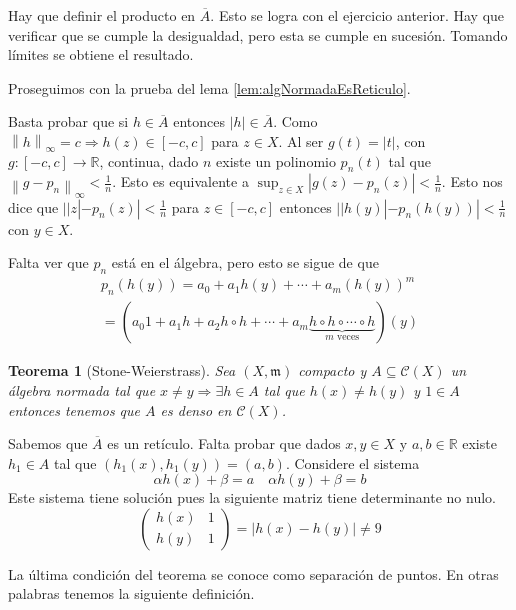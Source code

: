 \documentclass[12pt]{article}
\theoremstyle{plain}
\newtheorem{Th}{Teorema}[subsection]   %
\theoremstyle{definition}
\theoremstyle{remark}
\numberwithin{equation}{section}
\newcommand{\bR}{\mathbb{R}}        %
\newcommand{\cC}{\mathcal{C}}       %
\newcommand{\mm}{\mathfrak{m}}      %
\renewcommand{\:}{\colon}           %
\newcommand{\bonj}[1]{\left\lbrack#1\right\rbrack}
\newcommand{\nm}[1]{\left\|#1\right\|} %
\begin{document}
\begin{multicols}{2}
 \begin{ptcb}
 Hay que definir el producto en $\overline{A}$. Esto se logra con el ejercicio anterior. Hay que verificar que se cumple la desigualdad, pero esta se cumple en sucesión. Tomando límites se obtiene el resultado.
 \end{ptcb}

 Proseguimos con la prueba del lema \ref{lem:algNormadaEsReticulo}.
 \begin{ptcbp}
 Basta probar que si $h\in\overline{A}$ entonces $|h|\in\overline{A}$. Como $\nm{h}_\infty=c\Rightarrow h(z)\in\bonj{-c,c}$ para $z\in X$. Al ser $g(t)=|t|$, con $g\colon\bonj{-c,c}\to\bR$, continua, dado $n$ existe un polinomio $p_n(t)$ tal que $\nm{g-p_n}_\infty<\frac{1}{n}$. Esto es equivalente a $\sup_{z\in X}|g(z)-p_n(z)|<\frac{1}{n}$. Esto nos dice que $| |z|-p_n(z)|<\frac{1}{n}$ para $z\in\bonj{-c,c}$ entonces $| |h(y)|-p_n(h(y))|<\frac{1}{n}$ con $y\in X$.\par
 Falta ver que $p_n$ está en el álgebra, pero esto se sigue de que
\begin{gather*}
  p_n(h(y))=a_0+a_1h(y)+\cdots+a_m(h(y))^m \\
  =\left(a_0\mathit{1}+a_1h+a_2h\circ h+\cdots+a_m\underbrace{h\circ h\circ\cdots\circ h}_{m\,\,\text{veces}}\right)(y)
\end{gather*}
 \end{ptcbp}

 \begin{Th}[Stone-Weierstrass]\label{thm:StoneWeierstrass}
   Sea $(X,\mm)$ compacto y $A\subseteq \cC(X)$ un álgebra normada tal que $x\neq y\Rightarrow\exists h\in A$ tal que $h(x)\neq h(y)$ y $\mathit{1}\in A$ entonces tenemos que $A$ es denso en $\cC(X)$.
 \end{Th}

 \begin{ptcbp}
 Sabemos que $\overline{A}$ es un retículo. Falta probar que dados $x,y\in X$ y $a,b\in\bR$ existe $h_1\in A$ tal que $(h_1(x),h_1(y))=(a,b)$. Considere el sistema
 $$\alpha h(x)+\beta=a\quad \alpha h(y)+\beta =b$$
 Este sistema tiene solución pues la siguiente matriz tiene determinante no nulo.
 $$
 \begin{pmatrix}
   h(x) & 1 \\
   h(y) & 1
 \end{pmatrix}
 =
 |h(x)-h(y)|\neq 9
 $$
 \end{ptcbp}
La última condición del teorema se conoce como separación de puntos. En otras palabras tenemos la siguiente definición.


\end{multicols}
\end{document}
